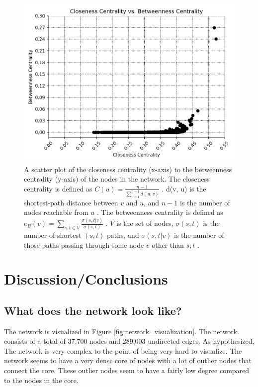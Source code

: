\documentclass[9pt,twocolumn,twoside]{pnas-new}
\begin{document}
\begin{figure}
\centering
\includegraphics[width=.8\linewidth]{centralities}
\caption{A scatter plot of the closeness centrality (x-axis) to the betweenness centrality (y-axis) of the nodes in the network. The closeness centrality is defined as $C(u) =\frac{n-1}{\sum_{v=1}^{n-1}d(u, v)}$ \cite{networkxclosenesscentrality}. d(v, u) is the shortest-path distance between $v$ and $u$, and $n-1$ is the number of nodes reachable from $u$ \cite{networkxclosenesscentrality}. The betweenness centrality is defined as $e_{B}(v)=\sum_{s,t\in V}^{}\frac{\sigma(s, t|v)}{\sigma(s, t)}$ \cite{networkxbetweennesscentrality}. $V$ is the set of nodes, $\sigma(s, t)$ is the number of shortest $(s, t)$-paths, and $\sigma(s, t|v)$ is the number of those paths passing through some node $v$ other than $s, t$ \cite{networkxbetweennesscentrality}. 
}
\label{fig:centralities}
\end{figure}

\section*{Discussion/Conclusions}

\subsection*{What does the network look like?}

The network is visualized in Figure \ref{fig:network_visualization}. The network consists of a total of 37,700 nodes and 289,003 undirected edges. As hypothesized, The network is very complex to the point of being very hard to visualize. The network seems to have a very dense core of nodes with a lot of outlier nodes that connect the core. These outlier nodes seem to have a fairly low degree compared to the nodes in the core.
\end{document}
